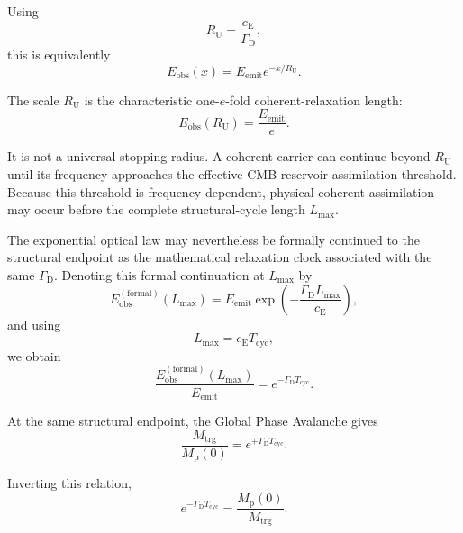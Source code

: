 Using
\begin{equation}
    R_{\mathrm{U}}
    =
    \frac{c_{\mathrm{E}}}{\Gamma_{\mathrm{D}}},
\end{equation}
this is equivalently
\begin{equation}
    E_{\mathrm{obs}}(x)
    =
    E_{\mathrm{emit}}
    e^{-x/R_{\mathrm{U}}}.
\end{equation}

The scale $R_{\mathrm{U}}$ is the characteristic one-$e$-fold coherent-relaxation length:
\begin{equation}
    E_{\mathrm{obs}}(R_{\mathrm{U}})
    =
    \frac{E_{\mathrm{emit}}}{e}.
\end{equation}

It is not a universal stopping radius. A coherent carrier can continue beyond $R_{\mathrm{U}}$ until its frequency approaches the effective CMB-reservoir assimilation threshold. Because this threshold is frequency dependent, physical coherent assimilation may occur before the complete structural-cycle length $L_{\mathrm{max}}$.

The exponential optical law may nevertheless be formally continued to the structural endpoint as the mathematical relaxation clock associated with the same $\Gamma_{\mathrm{D}}$. Denoting this formal continuation at $L_{\mathrm{max}}$ by
\begin{equation}
    E_{\mathrm{obs}}^{(\mathrm{formal})}(L_{\mathrm{max}})
    =
    E_{\mathrm{emit}}
    \exp\left(
        -\frac{\Gamma_{\mathrm{D}}L_{\mathrm{max}}}
        {c_{\mathrm{E}}}
    \right),
\end{equation}
and using
\begin{equation}
    L_{\mathrm{max}}
    =
    c_{\mathrm{E}}T_{\mathrm{cyc}},
\end{equation}
we obtain
\begin{equation}
    \frac{
        E_{\mathrm{obs}}^{(\mathrm{formal})}(L_{\mathrm{max}})
    }{
        E_{\mathrm{emit}}
    }
    =
    e^{-\Gamma_{\mathrm{D}}T_{\mathrm{cyc}}}.
\end{equation}

At the same structural endpoint, the Global Phase Avalanche gives
\begin{equation}
    \frac{
        M_{\mathrm{trg}}
    }{
        M_{\mathrm{p}}(0)
    }
    =
    e^{+\Gamma_{\mathrm{D}}T_{\mathrm{cyc}}}.
\end{equation}

Inverting this relation,
\begin{equation}
    e^{-\Gamma_{\mathrm{D}}T_{\mathrm{cyc}}}
    =
    \frac{
        M_{\mathrm{p}}(0)
    }{
        M_{\mathrm{trg}}
    }.
\end{equation}

